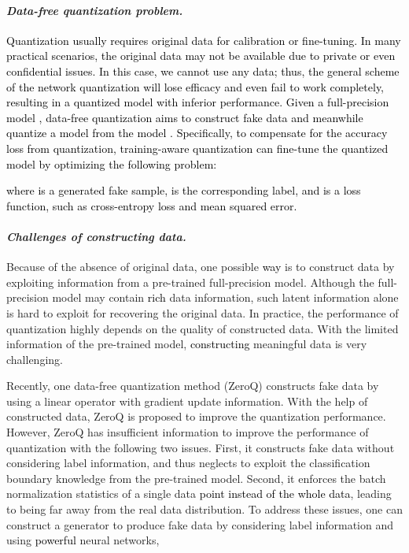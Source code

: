 \documentclass[runningheads]{llncs}
\def\jie{\textcolor{black}}
\def\new{\textcolor{black}}
\begin{document}
\paragraph{\textbf{\emph{Data-free quantization problem.}}}
\jie{
Quantization usually requires original data for calibration or fine-tuning.
In many practical scenarios, the original data may not be available due to private or even confidential issues.
In this case, we cannot use any data\new{; thus,} the general scheme of the network quantization will lose efficacy and even fail to work completely, resulting in a quantized model with inferior performance.
Given a full-precision model , data-free quantization aims to construct fake data  and meanwhile quantize a model  from the model . 
Specifically, to compensate for the accuracy loss from quantization, training-aware quantization can fine-tune the quantized model by optimizing the following problem:

where  is a generated fake sample,  is the corresponding label\new{, and}  is a loss function, such as cross-entropy loss and mean squared error.
}



\paragraph{\textbf{\emph{Challenges of constructing data.}}}
Because of the absence of original data, one possible \new{way} is to construct data by exploiting information from a pre-trained full-precision model. 
Although the full-precision model may contain \new{rich} data information, such latent information alone is hard to exploit for recovering the original data.
In practice, the performance of quantization highly depends on the quality of constructed data.
With the limited information of the pre-trained model, \new{constructing} meaningful data is very challenging.

Recently, one data-free quantization method (ZeroQ) \cite{Cai_2020_CVPR} constructs fake data by using a linear operator with gradient update information.
With the help of constructed data, ZeroQ is proposed to improve the quantization performance.
However, ZeroQ has insufficient information to improve the performance of quantization with the following two issues.
First, it constructs fake data without considering label information, and thus neglects to exploit the classification boundary knowledge from the pre-trained model. 
Second, it enforces the batch normalization statistics of a single data \new{point instead of the whole data}, leading to being far away from the real data distribution.
To address these issues, one can construct a generator  to produce fake data by considering label information and using \new{powerful} neural networks,
\end{document}
